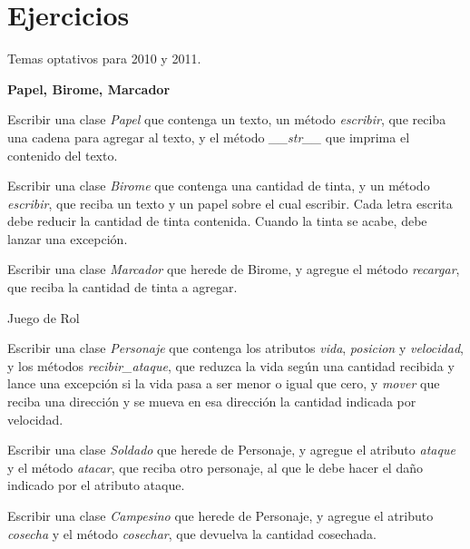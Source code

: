 \newpage
\section{Ejercicios}

\begin{extract}
Temas optativos para 2010 y 2011.
\end{extract}

\begin{ejercicio}
{\bf Papel, Birome, Marcador}
\begin{partes}
    \item Escribir una clase {\it Papel} que contenga un texto, un método {\it
escribir}, que reciba una cadena para agregar al texto, y el método {\it
\_\_str\_\_} que imprima el contenido del texto.
    \item Escribir una clase {\it Birome} que contenga una cantidad de tinta, y
un método {\it escribir}, que reciba un texto y un papel sobre el cual
escribir. Cada letra escrita debe reducir la cantidad de tinta contenida.
Cuando la tinta se acabe, debe lanzar una excepción.
    \item Escribir una clase {\it Marcador} que herede de Birome, y agregue el
método {\it recargar}, que reciba la cantidad de tinta a agregar.
\end{partes}
\end{ejercicio}


\begin{ejercicio}
Juego de Rol
\begin{partes}
    \item Escribir una clase {\it Personaje} que contenga los atributos {\it
vida}, {\it posicion} y {\it velocidad}, y los métodos {\it
recibir\_ataque}, que reduzca la vida según una cantidad recibida y lance
una excepción si la vida pasa a ser menor o igual que cero, y {\it
mover} que reciba una dirección y se mueva en esa dirección la cantidad
indicada por velocidad.
    \item Escribir una clase {\it Soldado} que herede de Personaje, y agregue
el atributo {\it ataque} y el método {\it atacar}, que reciba otro
personaje, al que le debe hacer el daño indicado por el atributo ataque.
    \item Escribir una clase {\it Campesino} que herede de Personaje, y agregue
el atributo {\it cosecha} y el método {\it cosechar}, que devuelva la
cantidad cosechada.
\end{partes}
\end{ejercicio}


